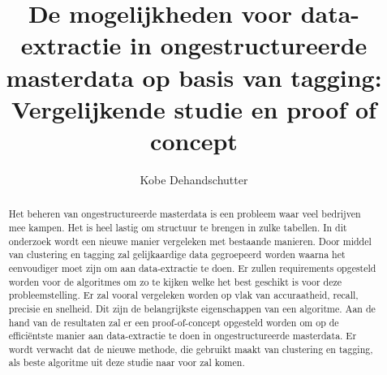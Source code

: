 \documentclass{hogent-article}
\title{De mogelijkheden voor data-extractie in ongestructureerde masterdata op basis van tagging: Vergelijkende studie en proof of concept}
\author{Kobe Dehandschutter}
\begin{document}
\begin{abstract}

  Het beheren van ongestructureerde masterdata is een probleem waar veel bedrijven mee kampen. Het is heel lastig om structuur te brengen in zulke tabellen. In dit onderzoek wordt een nieuwe manier vergeleken met bestaande manieren. Door middel van clustering en tagging zal gelijkaardige data gegroepeerd worden waarna het eenvoudiger moet zijn om aan data-extractie te doen. Er zullen requirements opgesteld worden voor de algoritmes om zo te kijken welke het best geschikt is voor deze probleemstelling. Er zal vooral vergeleken worden op vlak van accuraatheid, recall, precisie en snelheid. Dit zijn de belangrijkste eigenschappen van een algoritme. Aan de hand van de resultaten zal er een proof-of-concept opgesteld worden om op de efficiëntste manier aan data-extractie te doen in ongestructureerde masterdata. Er wordt verwacht dat de nieuwe methode, die gebruikt maakt van clustering en tagging, als beste algoritme uit deze studie naar voor zal komen.
\end{abstract}

\tableofcontents



\printbibliography[heading=bibintoc]
\end{document}
